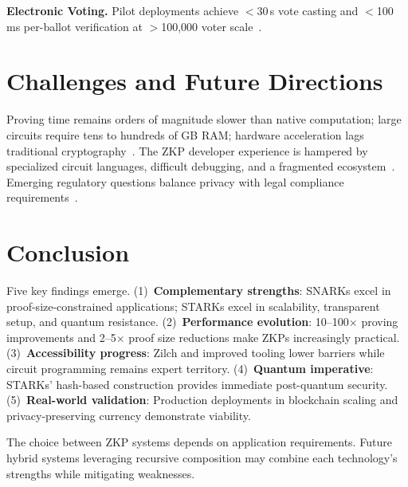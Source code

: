 \documentclass[sigconf,nonacm]{acmart}
\begin{document}
\textbf{Electronic Voting.} Pilot deployments achieve $<$30\,s vote casting and
$<$100\,ms per-ballot verification at $>$100,000 voter
scale~\cite{zkp_voting_2023,evoting_2024}.

\section{Challenges and Future Directions}
\label{sec:challenges}

Proving time remains orders of magnitude slower than native computation; large circuits
require tens to hundreds of GB RAM; hardware acceleration lags traditional
cryptography~\cite{hardware_acceleration_2023,fpga_proving_2024}. The ZKP developer
experience is hampered by specialized circuit languages, difficult debugging, and a
fragmented ecosystem~\cite{accessibility_gap_2024,standardization_needs_2023}. Emerging
regulatory questions balance privacy with legal compliance
requirements~\cite{regulation_zkp_2024}.

\section{Conclusion}
\label{sec:conclusion}
\sloppy

Five key findings emerge. (1)~\textbf{Complementary strengths}: SNARKs excel in
proof-size-constrained applications; STARKs excel in scalability, transparent setup,
and quantum resistance. (2)~\textbf{Performance evolution}: 10--100$\times$ proving
improvements and 2--5$\times$ proof size reductions make ZKPs increasingly practical.
(3)~\textbf{Accessibility progress}: Zilch and improved tooling lower barriers while
circuit programming remains expert territory. (4)~\textbf{Quantum imperative}: STARKs'
hash-based construction provides immediate post-quantum security. (5)~\textbf{Real-world
validation}: Production deployments in blockchain scaling and privacy-preserving
currency demonstrate viability.

The choice between ZKP systems depends on application requirements. Future hybrid
systems leveraging recursive composition may combine each technology's strengths while
mitigating weaknesses.
\end{document}

